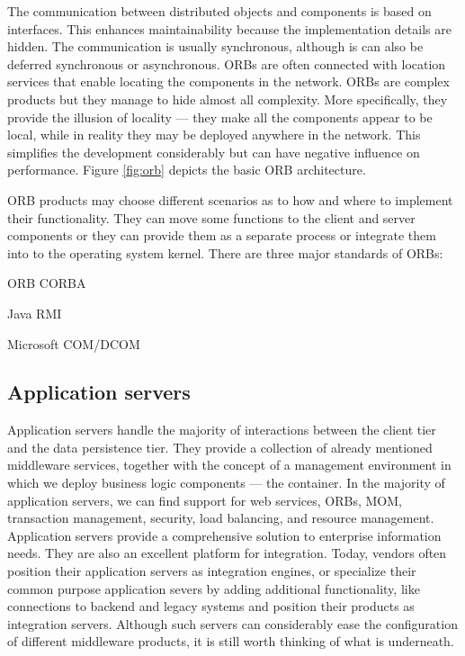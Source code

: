 The communication between distributed objects and components is based on interfaces. This enhances maintainability because the implementation details are hidden. The communication is usually synchronous, although is can also be deferred synchronous or asynchronous. ORBs are often connected with location services that enable locating the components in the network. ORBs are complex products but they manage to hide almost all complexity. More specifically, they provide the illusion of locality --- they make all the components appear to be local, while in reality they may be deployed anywhere in the network. This simplifies the development considerably but can have negative influence on performance. Figure \ref{fig:orb} depicts the basic ORB architecture. \cite{soaatoi}

ORB products may choose different scenarios as to how and where to implement their functionality. They can move some functions to the client and server components or they can provide them as a separate process or integrate them into to the operating system kernel. There are three major standards of ORBs:

\begin{compactenum}
\item  ORB CORBA

\item  Java RMI

\item  Microsoft COM/DCOM
\end{compactenum}

\subsection{Application servers}

Application servers handle the majority of interactions between the client tier and the data persistence tier. They provide a collection of already mentioned middleware services, together with the concept of a management environment in which we deploy business logic components --- the container. In the majority of application servers, we can find support for web services, ORBs, MOM, transaction management, security, load balancing, and resource management. Application servers provide a comprehensive solution to enterprise information needs. They are also an excellent platform for integration. Today, vendors often position their application servers as integration engines, or specialize their common purpose application severs by adding additional functionality, like connections to backend and legacy systems and position their products as integration servers. Although such servers can considerably ease the configuration of different middleware products, it is still worth thinking of what is underneath.


